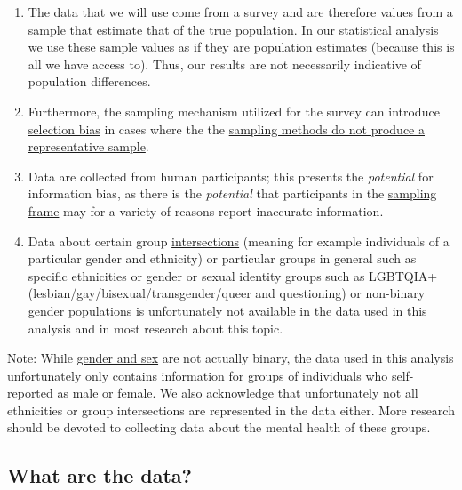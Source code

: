 \documentclass[
]{article}
\begin{document}
\begin{enumerate}
\def\labelenumi{\arabic{enumi}.}
\item
  The data that we will use come from a survey and are therefore values
  from a sample that estimate that of the true population. In our
  statistical analysis we use these sample values as if they are
  population estimates (because this is all we have access to). Thus,
  our results are not necessarily indicative of population differences.
\item
  Furthermore, the sampling mechanism utilized for the survey can
  introduce
  \href{https://en.wikipedia.org/wiki/Selection_bias?oldformat=true}{selection
  bias} in cases where the the
  \href{https://en.wikipedia.org/wiki/Sampling_(statistics)?oldformat=true}{sampling
  methods do not produce a representative sample}.
\item
  Data are collected from human participants; this presents the
  \emph{potential} for information bias, as there is the
  \emph{potential} that participants in the
  \href{https://en.wikipedia.org/wiki/Sampling_frame?oldformat=true}{sampling
  frame} may for a variety of reasons report inaccurate information.
\item
  Data about certain group
  \href{https://www.vox.com/the-highlight/2019/5/20/18542843/intersectionality-conservatism-law-race-gender-discrimination}{intersections}
  (meaning for example individuals of a particular gender and ethnicity)
  or particular groups in general such as specific ethnicities or gender
  or sexual identity groups such as LGBTQIA+
  (lesbian/gay/bisexual/transgender/queer and questioning) or non-binary
  gender populations is unfortunately not available in the data used in
  this analysis and in most research about this topic.
\end{enumerate}

Note: While
\href{https://www.who.int/genomics/gender/en/index1.html}{gender and
sex} are not actually binary, the data used in this analysis
unfortunately only contains information for groups of individuals who
self-reported as male or female. We also acknowledge that unfortunately
not all ethnicities or group intersections are represented in the data
either. More research should be devoted to collecting data about the
mental health of these groups.

\hypertarget{what-are-the-data}{%
\subsection{\texorpdfstring{\textbf{What are the
data?}}{What are the data?}}\label{what-are-the-data}}
\end{document}
